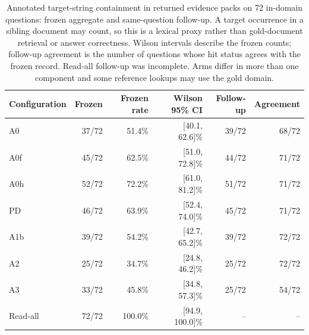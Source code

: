 \documentclass[11pt]{article}
\begin{document}
\begin{table}
\centering\small
\caption{Annotated target-string containment in returned evidence packs on 72
in-domain questions: frozen aggregate and same-question follow-up. A target
occurrence in a sibling document may count, so this is a lexical proxy rather
than gold-document retrieval or answer correctness. Wilson intervals describe
the frozen counts; follow-up agreement is the number of questions whose hit
status agrees with the frozen record. Read-all follow-up was incomplete. Arms
differ in more than one component and some reference lookups may use the gold
domain.}

\begin{tabular}{lrrrrr}
\toprule
Configuration & Frozen & Frozen rate & Wilson 95\% CI & Follow-up & Agreement \\
\midrule
A0 & 37/72 & 51.4\% & [40.1, 62.6]\% & 39/72 & 68/72 \\
A0f & 45/72 & 62.5\% & [51.0, 72.8]\% & 44/72 & 71/72 \\
A0h & 52/72 & 72.2\% & [61.0, 81.2]\% & 51/72 & 71/72 \\
PD & 46/72 & 63.9\% & [52.4, 74.0]\% & 45/72 & 71/72 \\
A1b & 39/72 & 54.2\% & [42.7, 65.2]\% & 39/72 & 72/72 \\
A2 & 25/72 & 34.7\% & [24.8, 46.2]\% & 25/72 & 72/72 \\
A3 & 33/72 & 45.8\% & [34.8, 57.3]\% & 25/72 & 54/72 \\
Read-all & 72/72 & 100.0\% & [94.9, 100.0]\% & -- & -- \\
\bottomrule
\end{tabular}
\end{table}
\end{document}
